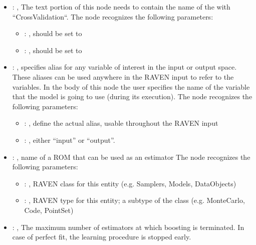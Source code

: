\begin{itemize}
    \item {}: , 
      The text portion of this node needs to contain the name of the  with
               ``CrossValidation``.
      The  node recognizes the following parameters:
        \begin{itemize}
          \item {}: , 
            should be set to 
          \item {}: , 
            should be set to 
      \end{itemize}

    \item {}: , 
      specifies alias for         any variable of interest in the input or output space. These
      aliases can be used anywhere in the RAVEN input to         refer to the variables. In the body
      of this node the user specifies the name of the variable that the model is going to use
      (during its execution).
      The  node recognizes the following parameters:
        \begin{itemize}
          \item {}: , 
            define the actual alias, usable throughout the RAVEN input
          \item {}: , 
            either ``input'' or ``output''.
      \end{itemize}

    \item {}: , 
      name of a ROM that can be used as an estimator
      The  node recognizes the following parameters:
        \begin{itemize}
          \item {}: , 
            RAVEN class for this entity (e.g. Samplers, Models, DataObjects)
          \item {}: , 
            RAVEN type for this entity; a subtype of the class (e.g. MonteCarlo, Code, PointSet)
      \end{itemize}

    \item {}: , 
      The maximum number of estimators at which boosting is
      terminated. In case of perfect fit, the learning procedure is
      stopped early.


\end{itemize}
